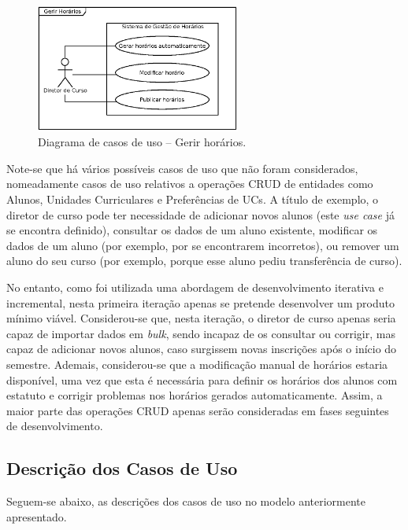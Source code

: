 \documentclass[12pt, a4paper]{article}
\begin{document}
\begin{figure}[H]
    \centering
    \includegraphics[width=0.6\textwidth]{Imagens/Modelos/UseCasesGerirHorarios.eps}
    \caption{Diagrama de casos de uso -- Gerir horários.}
\end{figure}

Note-se que há vários possíveis casos de uso que não foram considerados, nomeadamente casos de
uso relativos a operações CRUD de entidades como Alunos, Unidades Curriculares e Preferências de
UCs. A título de exemplo, o diretor de curso pode ter necessidade de adicionar novos alunos (este
\emph{use case} já se encontra definido), consultar os dados de um aluno existente, modificar os
dados de um aluno (por exemplo, por se encontrarem incorretos), ou remover um aluno do seu curso
(por exemplo, porque esse aluno pediu transferência de curso).

No entanto, como foi utilizada uma abordagem de desenvolvimento iterativa e incremental, nesta
primeira iteração apenas se pretende desenvolver um produto mínimo viável. Considerou-se que, nesta
iteração, o diretor de curso apenas seria capaz de importar dados em \emph{bulk}, sendo incapaz de
os consultar ou corrigir, mas capaz de adicionar novos alunos, caso surgissem novas inscrições após
o início do semestre. Ademais, considerou-se que a modificação manual de horários estaria
disponível, uma vez que esta é necessária para definir os horários dos alunos com estatuto e
corrigir problemas nos horários gerados automaticamente. Assim, a maior parte das operações CRUD
apenas serão consideradas em fases seguintes de desenvolvimento.

\subsection{Descrição dos Casos de Uso}

Seguem-se abaixo, as descrições dos casos de uso no modelo anteriormente apresentado.
\end{document}
